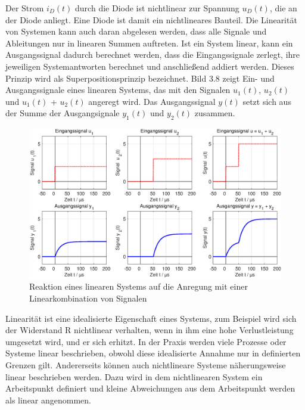\noindent Der Strom $i_{D}(t)$  durch die Diode ist nichtlinear zur Spannung $u_{D}(t)$, die an der Diode anliegt. Eine Diode ist damit ein nichtlineares Bauteil.\newline
Die Linearität von Systemen kann auch daran abgelesen werden, dass alle Signale und Ableitungen nur in linearen Summen auftreten. Ist ein System linear, kann ein Ausgangssignal dadurch berechnet werden, dass die Eingangssignale zerlegt, ihre jeweiligen Systemantworten berechnet und anschließend addiert werden. Dieses Prinzip wird als Superpositionsprinzip bezeichnet. Bild 3.8 zeigt Ein- und Ausgangssignale eines linearen Systems, das mit den Signalen $u_{1}(t)$, $u_{2}(t)$ und $u_{1}(t)$ + $u_{2}(t)$ angeregt wird. Das Ausgangssignal $y(t)$ setzt sich aus der Summe der Ausgangsignale $y_{1}(t)$ und $y_{2}(t)$ zusammen.

\begin{figure}[H]
  \centerline{\includegraphics[width=1\textwidth]{Kapitel2/Bilder/image8}}
  \caption{Reaktion eines linearen Systems auf die Anregung mit einer Linearkombination von Signalen}
  \label{fig:Linearitat}
\end{figure}

\noindent Linearität ist eine idealisierte Eigenschaft eines Systems, zum Beispiel wird sich der Widerstand R nichtlinear verhalten, wenn in ihm eine hohe Verlustleistung umgesetzt wird, und er sich erhitzt. In der Praxis werden viele Prozesse oder Systeme linear beschrieben, obwohl diese idealisierte Annahme nur in definierten Grenzen gilt. Andererseits können auch nichtlineare Systeme näherungsweise linear beschrieben werden. Dazu wird in dem nichtlinearen System ein Arbeitspunkt definiert und kleine Abweichungen aus dem Arbeitspunkt werden als linear angenommen.\bigskip

